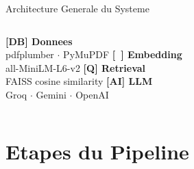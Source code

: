 \documentclass[aspectratio=169, 10pt]{beamer}
\begin{document}
\begin{frame}{Architecture Generale du Systeme}
  \vspace{0.55cm}
  \begin{columns}[T]
      \centering\small\textbf{[DB] Donnees}\\
      \tiny pdfplumber $\cdot$ PyMuPDF
      \centering\small\textbf{[~] Embedding}\\
      \tiny all-MiniLM-L6-v2
      \centering\small\textbf{[Q] Retrieval}\\
      \tiny FAISS cosine similarity
      \centering\small\textbf{[AI] LLM}\\
      \tiny Groq $\cdot$ Gemini $\cdot$ OpenAI
  \end{columns}
\end{frame}

\section{Etapes du Pipeline}
\end{document}
